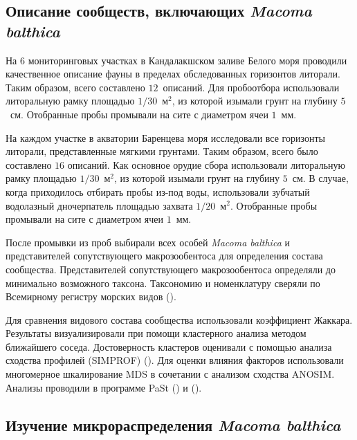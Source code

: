    \subsection{Описание сообществ, включающих {\it Macoma balthica}}
На 6 мониторинговых участках в Кандалакшском заливе Белого моря проводили качественное описание фауны в пределах обследованных горизонтов литорали.
Таким образом, всего составлено $12$~описаний.
Для пробоотбора использовали литоральную рамку площадью $1/30$~м$^2$, из которой изымали грунт на глубину $5$~см. 
Отобранные пробы промывали на сите с диаметром ячеи $1$~мм. 

На каждом участке в акватории Баренцева моря исследовали все  горизонты литорали, представленные мягкими грунтами.  
Таким образом, всего было составлено $16$ описаний.
Как основное орудие сбора использовали литоральную рамку площадью $1/30$~м$^2$, из которой изымали грунт на глубину $5$~см. 
В случае, когда приходилось отбирать пробы из-под воды, использовали зубчатый водолазный дночерпатель площадью захвата $1/20$~м$^2$.
Отобранные пробы промывали на сите с диаметром ячеи $1$~мм. 

После промывки из   проб   выбирали   всех   особей  {\it Macoma   balthica}  и   представителей   сопутствующего макрозообентоса    для   определения   состава   сообщества.
Представителей   сопутствующего макрозообентоса  определяли   до   минимально   возможного   таксона. Таксономию и номенклатуру сверяли по Всемирному регистру морских видов (\cite{WoRMS}).

Для сравнения видового состава сообщества использовали коэффициент Жаккара. 
Результаты визуализировали при помощи  кластерного анализа методом ближайшего соседа. 
Достоверность кластеров оценивали с помощью анализа сходства профилей (SIMPROF) (\cite{Clarke_et_al_2008}).
Для оценки влияния факторов использовали многомерное шкалирование MDS в сочетании с анализом сходства ANOSIM.
Анализы проводили в программе PaSt (\cite{Hammer_et_al_2001}) и \R (\cite{R_2014}).


	\subsection{Изучение микрораспределения {\it Macoma balthica}}



